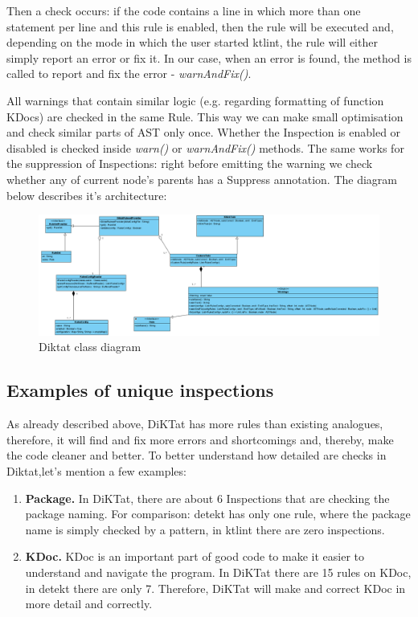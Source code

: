 Then a check occurs: if the code contains a line in which more than one statement per line and this rule is enabled, then the rule will be executed and, depending on the mode in which the user started ktlint, the rule will either simply report an error or fix it. In our case, when an error is found, the method is called to report and fix the error - \textsl{warnAndFix()}.

All warnings that contain similar logic (e.g. regarding formatting of function KDocs) are checked in the same Rule. This way we can make small optimisation and check similar parts of AST only once. Whether the Inspection is enabled or disabled is checked inside \textsl{warn()} or \textsl{warnAndFix()} methods. The same works for the suppression of Inspections: right before emitting the warning we check whether any of current node's parents has a Suppress annotation. The diagram below describes it's architecture:

\begin{figure}[H]
    \centering
    \includegraphics[scale=0.5]{pictures/class.PNG}
    \caption{Diktat class diagram}
    \label{fig:top_languages}
\end{figure}


\subsection{Examples of unique inspections}
\par
As already described above, DiKTat has more rules than existing analogues, therefore, it will find and fix more errors and shortcomings and, thereby, make the code cleaner and better. To better understand how detailed are checks in Diktat,let's mention a few examples:

\begin{enumerate}
    \item \textbf{Package.}
In DiKTat, there are about 6 Inspections that are checking the package naming. For comparison: detekt has only one rule, where the package name is simply checked by a pattern, in ktlint there are zero inspections.
    \item \textbf{KDoc.}
KDoc is an important part of good code to make it easier to understand and navigate the program. In DiKTat there are 15 rules on KDoc, in detekt there are only 7. Therefore, DiKTat will make and correct KDoc in more detail and correctly.
\end{enumerate}

